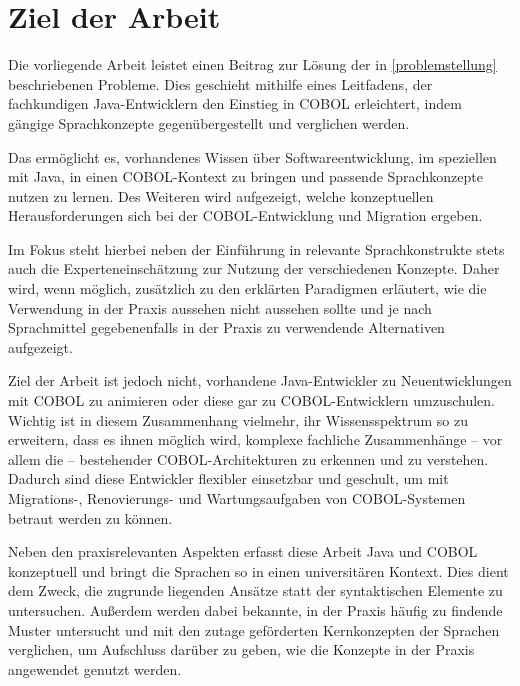 \section{Ziel der Arbeit}
Die vorliegende Arbeit leistet einen Beitrag zur Lösung der in \autoref{problemstellung} beschriebenen Probleme. Dies geschieht mithilfe eines Leitfadens, der fachkundigen Java-Entwicklern den Einstieg in COBOL erleichtert, indem gängige Sprachkonzepte gegenübergestellt und verglichen werden. 

Das ermöglicht es, vorhandenes Wissen über Softwareentwicklung, im speziellen mit Java, in einen COBOL-Kontext zu bringen und passende Sprachkonzepte nutzen zu lernen. Des Weiteren wird aufgezeigt, welche konzeptuellen Herausforderungen sich bei der COBOL-Entwicklung und Migration ergeben.

Im Fokus steht hierbei neben der Einführung in relevante Sprachkonstrukte stets auch die Experteneinschätzung zur Nutzung der verschiedenen Konzepte. Daher wird, wenn möglich, zusätzlich zu den erklärten Paradigmen erläutert, wie die Verwendung in der Praxis aussehen \bzw nicht aussehen sollte und je nach Sprachmittel gegebenenfalls in der Praxis zu verwendende Alternativen aufgezeigt.

Ziel der Arbeit ist jedoch nicht, vorhandene Java-Entwickler zu Neuentwicklungen mit COBOL zu animieren oder diese gar zu COBOL-Entwicklern umzuschulen. Wichtig ist in diesem Zusammenhang vielmehr, ihr Wissensspektrum so zu erweitern, dass es ihnen möglich wird, komplexe fachliche Zusammenhänge -- vor allem die  -- bestehender COBOL-Architekturen zu erkennen und zu verstehen. Dadurch sind diese Entwickler flexibler einsetzbar und geschult, um mit Migrations-, Renovierungs- und Wartungsaufgaben von COBOL-Systemen betraut werden zu können.

Neben den praxisrelevanten Aspekten erfasst diese Arbeit Java und COBOL konzeptuell und bringt die Sprachen so in einen universitären Kontext. Dies dient dem Zweck, die zugrunde liegenden Ansätze statt der syntaktischen Elemente zu untersuchen. Außerdem werden dabei bekannte, in der Praxis häufig zu findende Muster untersucht und mit den zutage geförderten Kernkonzepten der Sprachen verglichen, um Aufschluss darüber zu geben, wie die Konzepte in der Praxis angewendet \bzw genutzt werden.